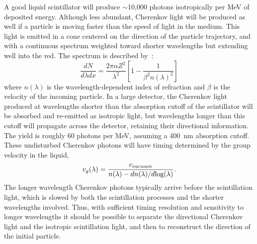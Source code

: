 \documentclass[aps,prc,twocolumn,groupedaddress,showpacs,amsmath,amssymb,floatfix,superscriptaddress]{revtex4}
\begin{document}
A good liquid scintillator will produce $\sim$10,000 photons
isotropically per MeV of deposited energy. Although less abundant,
Cherenkov light will be produced as well if a particle is moving
faster than the speed of light in the medium.  This light is emitted
in a cone centered on the direction of the particle trajectory, and
with a continuous spectrum weighted toward shorter wavelengths but
extending well into the red. The spectrum is described
by~\cite{Cherenkov34}:
\begin{equation}
\label{eqCherenkov}
\frac{dN}{d\lambda dx} = \frac{2 \pi \alpha Z^2}{\lambda^2} \left [ 1 - \frac{1}{\beta^2 n(\lambda)^2} \right ]
\end{equation}
where $n(\lambda)$ is the wavelength-dependent index of refraction and
$\beta$ is the velocity of the incoming particle. In a large detector,
the Cherenkov light produced at wavelengths shorter than the
absorption cutoff of the scintillator will be absorbed and re-emitted
as isotropic light, but wavelengths longer than this cutoff will
propagate across the detector, retaining their directional
information. The yield is roughly 60 photons per MeV, assuming a
400~nm absorption cutoff\cite{qdot}. These undisturbed Cherenkov
photons will have timing determined by the group velocity
\cite{group_velocity_article} in the liquid,
\begin{equation}
\label{eqGroup}
v_{g}(\lambda) = \frac{c_{vacuum}}{n(\lambda) - dn(\lambda)/d\textnormal{log}(\lambda)}.
\end{equation}
The longer wavelength Cherenkov photons typically arrive before the
scintillation light, which is slowed by both the scintillation
processes and the shorter wavelengths involved. Thus, with sufficient
timing resolution and sensitivity to longer wavelengths it should be
possible to separate the directional Cherenkov light and the isotropic
scintillation light, and then to reconstruct the direction of the
initial particle.
\end{document}
